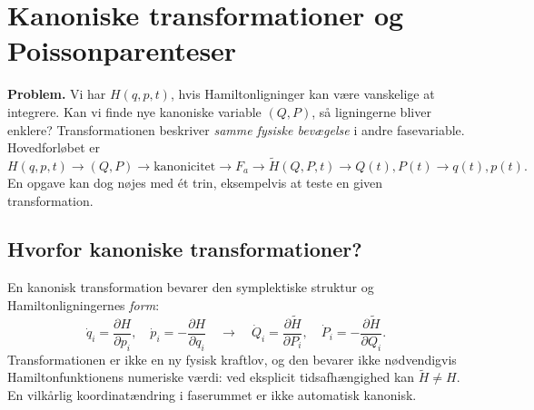 \clearpage\section{Kanoniske transformationer og Poissonparenteser}\label{sec:canon}
\textbf{Problem.} Vi har $H(q,p,t)$, hvis Hamiltonligninger kan være vanskelige at integrere. Kan vi finde nye kanoniske variable $(Q,P)$, så ligningerne bliver enklere? Transformationen beskriver \emph{samme fysiske bevægelse} i andre fasevariable. Hovedforløbet er
\[
H(q,p,t)\longrightarrow (Q,P)\longrightarrow\text{kanonicitet}
\longrightarrow F_a\longrightarrow\widetilde H(Q,P,t)
\longrightarrow Q(t),P(t)\longrightarrow q(t),p(t).
\]
En opgave kan dog nøjes med ét trin, eksempelvis at teste en given transformation.

\subsection{Hvorfor kanoniske transformationer?}
En kanonisk transformation bevarer den symplektiske struktur og Hamiltonligningernes \emph{form}:
\[
\dot q_i=\frac{\partial H}{\partial p_i},\quad
\dot p_i=-\frac{\partial H}{\partial q_i}
\quad\longrightarrow\quad
\dot Q_i=\frac{\partial\widetilde H}{\partial P_i},\quad
\dot P_i=-\frac{\partial\widetilde H}{\partial Q_i}.
\]
Transformationen er ikke en ny fysisk kraftlov, og den bevarer ikke nødvendigvis Hamiltonfunktionens numeriske værdi: ved eksplicit tidsafhængighed kan $\widetilde H\ne H$. En vilkårlig koordinatændring i faserummet er ikke automatisk kanonisk.

